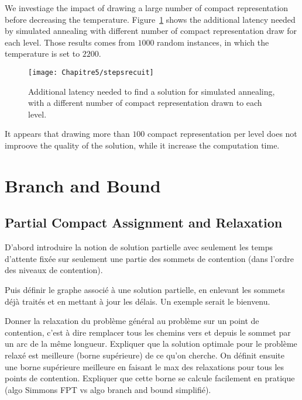  We investiage the impact of drawing a large number of compact representation before decreasing the temperature. Figure~\ref{fig:stepsrecuit} shows the additional latency needed by simulated annealing with different number of compact representation draw for each level. Those results comes from $1000$ random instances, in which the temperature is set to $2200$.
 
 \begin{figure}[h]
	\centering
	\texttt{[image: Chapitre5/stepsrecuit]}
\caption{ Additional latency needed to find a solution for simulated annealing, with a different number of compact representation drawn to each level.}
\label{fig:stepsrecuit}
\end{figure}
It appears that drawing more than $100$ compact representation per level does not improove the quality of the solution, while it increase the computation time.

 

\section{Branch and Bound}

\subsection{Partial Compact Assignment and Relaxation}

D'abord introduire la notion de solution partielle avec seulement les temps d'attente fixée
sur seulement une partie des sommets de contention (dans l'ordre des niveaux de contention).

Puis définir le graphe associé à une solution partielle, en enlevant les sommets déjà traités 
et en mettant à jour les délais. Un exemple serait le bienvenu.



Donner la relaxation du problème général au problème sur un point de contention, 
c'est à dire remplacer tous les chemins vers et depuis le sommet par un arc de la même longueur.
Expliquer que la solution optimale pour le problème relaxé est meilleure (borne supérieure) de
ce qu'on cherche. On définit ensuite une borne supérieure meilleure en faisant le max des 
relaxations pour tous les points de contention. Expliquer que cette borne se calcule facilement
en pratique (algo Simmons FPT vs algo branch and bound simplifié).


